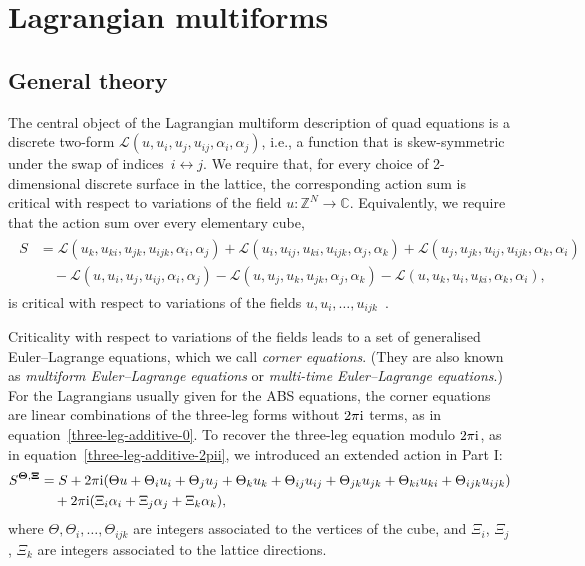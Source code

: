 \documentclass[pdftex]{sigma}
\newcommand{\C}{\mathbb{C}}
\newcommand{\Z}{\mathbb{Z}}
\newcommand{\cL}{\mathcal{L}}
\renewcommand{\vec}{\boldsymbol}
\numberwithin{equation}{section}
\begin{document}
\section{Lagrangian multiforms}
\label{sec-multiforms}

\subsection{General theory}

The central object of the Lagrangian multiform description of quad equations is a discrete two-form $\cL(u,u_i,u_j,u_{ij},\alpha_i,\alpha_j)$, i.e., a function that is skew-symmetric under the swap of indices~${i \leftrightarrow j}$. We require that, for every choice of 2-dimensional discrete surface in the lattice, the corresponding action sum is critical with respect to variations of the field $u\colon \Z^N \to \C$. Equivalently, we require that the action sum over every elementary cube,{\samepage
\begin{align*}
\begin{split}
 S &= \cL(u_k,u_{ki},u_{jk}, u_{ijk},\alpha_i,\alpha_j) + \cL(u_i,u_{ij},u_{ki}, u_{ijk},\alpha_j,\alpha_k) + \cL(u_j,u_{jk},u_{ij}, u_{ijk},\alpha_k,\alpha_i)
 \\ &\quad{} - \cL(u,u_i,u_j,u_{ij},\alpha_i,\alpha_j) - \cL(u,u_j,u_k,u_{jk},\alpha_j,\alpha_k) - \cL(u,u_k,u_i,u_{ki},\alpha_k,\alpha_i) ,
\end{split}
\end{align*}
is critical with respect to variations of the fields $u, u_i, \dots, u_{ijk}$~\cite{boll2014integrability}.}

Criticality with respect to variations of the fields leads to a set of generalised Euler--Lagrange equations, which we call \emph{corner equations}. (They are also known as \emph{multiform Euler--Lagrange equations} or \emph{multi-time Euler--Lagrange equations}.) For the Lagrangians usually given for the ABS equations, the corner equations are linear combinations of the three-leg forms without $2\pi {\rm i}$ terms, as in equation~\eqref{three-leg-additive-0}. To recover the three-leg equation modulo $2 \pi {\rm i}$, as in equation~\eqref{three-leg-additive-2pii}, we introduced an extended action in Part I:
\begin{align*}
 S^{\vec \Theta,\vec \Xi} &=
 S + 2 \pi {\rm i} ( \Theta u + \Theta_i u_i + \Theta_j u_j + \Theta_k u_k +\Theta_{ij} u_{ij} + \Theta_{jk} u_{jk} + \Theta_{ki} u_{ki} + \Theta_{ijk} u_{ijk}) \\
 &\quad{} + 2 \pi {\rm i} (\Xi_i \alpha_i + \Xi_j \alpha_j + \Xi_k \alpha_k),
\end{align*}
where $\Theta, \Theta_i, \dots, \Theta_{ijk}$ are integers associated to the vertices of the cube, and $\Xi_i$, $\Xi_j$, $\Xi_k$ are integers associated to the lattice directions.
\end{document}
